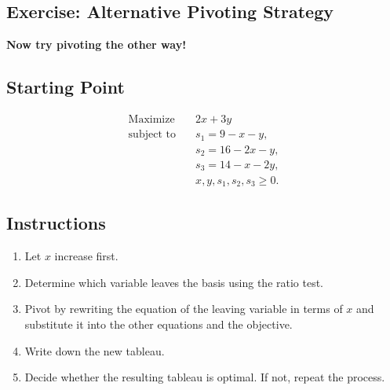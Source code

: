 \subsection*{Exercise: Alternative Pivoting Strategy}

\begin{exercise}{}{}
\textbf{Now try pivoting the other way!}

\subsection*{Starting Point}
\[
\begin{aligned}
\text{Maximize}\quad &  2x + 3y \\
\text{subject to}\quad & s_1 = 9 - x - y, \\
                        & s_2 = 16 - 2x - y, \\
                        & s_3 = 14 - x - 2y, \\
                        & x, y, s_1, s_2, s_3 \ge 0.
\end{aligned}
\]

\subsection*{Instructions}
\begin{enumerate}
    \item Let \(x\) increase first.
    \item Determine which variable leaves the basis using the ratio test.
    \item Pivot by rewriting the equation of the leaving variable in terms of \(x\) and substitute it into the other equations and the objective.
    \item Write down the new tableau.
    \item Decide whether the resulting tableau is optimal. If not, repeat the process.
\end{enumerate}
\end{exercise}

